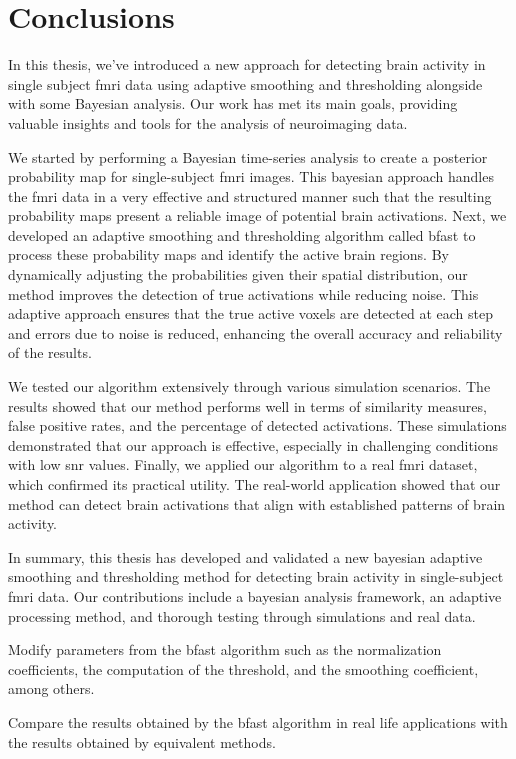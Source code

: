 \chapter{Conclusions}

In this thesis, we've introduced a new approach for detecting brain activity 
in single subject \gls{fmri} data using adaptive smoothing and 
thresholding alongside with some Bayesian analysis. Our work has met its 
main goals, providing valuable 
insights and tools for the analysis of neuroimaging data.

We started by performing a Bayesian time-series analysis to create a 
posterior probability map for single-subject \gls{fmri} images. This bayesian 
approach handles the \gls{fmri} data in a very effective and structured manner 
such that the resulting probability maps present a reliable image 
of potential brain activations. Next, we developed an adaptive smoothing and 
thresholding algorithm called \gls{bfast} to process these probability maps and 
identify the active brain regions. By dynamically adjusting the probabilities 
given their spatial distribution, our method improves the detection of true 
activations while reducing noise. This adaptive approach ensures that the true 
active voxels are detected at each step and errors due to noise is reduced, enhancing 
the overall accuracy and reliability of the results.

We tested our algorithm extensively through various simulation scenarios. 
The results showed that our method performs well in terms of similarity 
measures, false positive rates, and the percentage of detected activations. 
These simulations demonstrated that our approach is effective, 
especially in challenging conditions with low \gls{snr} values. Finally, we applied our algorithm to a real \gls{fmri} dataset, which confirmed 
its practical utility. The real-world application showed that our method 
can detect brain activations that align with established patterns 
of brain activity. 

In summary, this thesis has developed and validated a new bayesian adaptive 
smoothing and thresholding method for detecting brain activity in single-subject 
\gls{fmri} data. Our contributions include a bayesian analysis framework, 
an adaptive processing method, and thorough testing through simulations and 
real data.


Modify parameters from the \gls{bfast} algorithm such as the
normalization coefficients, the computation of the threshold,
and the smoothing coefficient, among others.

Compare the results obtained by the \gls{bfast} algorithm in real life
applications with the results obtained by equivalent methods.